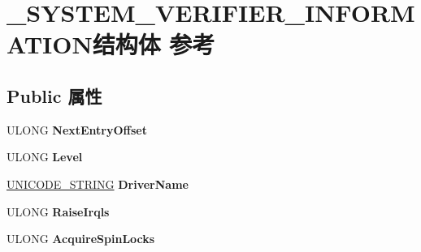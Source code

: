 \hypertarget{struct___s_y_s_t_e_m___v_e_r_i_f_i_e_r___i_n_f_o_r_m_a_t_i_o_n}{}\section{\+\_\+\+S\+Y\+S\+T\+E\+M\+\_\+\+V\+E\+R\+I\+F\+I\+E\+R\+\_\+\+I\+N\+F\+O\+R\+M\+A\+T\+I\+O\+N结构体 参考}
\label{struct___s_y_s_t_e_m___v_e_r_i_f_i_e_r___i_n_f_o_r_m_a_t_i_o_n}
\subsection*{Public 属性}
\begin{DoxyCompactItemize}
\item 
\mbox{\label{struct___s_y_s_t_e_m___v_e_r_i_f_i_e_r___i_n_f_o_r_m_a_t_i_o_n_a7ab8bb6abb715bb66587244fa818f1f8}} 
U\+L\+O\+NG {\bfseries Next\+Entry\+Offset}
\item 
\mbox{\label{struct___s_y_s_t_e_m___v_e_r_i_f_i_e_r___i_n_f_o_r_m_a_t_i_o_n_af77c91cba6a04098281ea027ee5c196c}} 
U\+L\+O\+NG {\bfseries Level}
\item 
\mbox{\label{struct___s_y_s_t_e_m___v_e_r_i_f_i_e_r___i_n_f_o_r_m_a_t_i_o_n_ab1b5341042df119610ce9576370f8b06}} 
\hyperlink{struct___u_n_i_c_o_d_e___s_t_r_i_n_g}{U\+N\+I\+C\+O\+D\+E\+\_\+\+S\+T\+R\+I\+NG} {\bfseries Driver\+Name}
\item 
\mbox{\label{struct___s_y_s_t_e_m___v_e_r_i_f_i_e_r___i_n_f_o_r_m_a_t_i_o_n_a3f919abc1bfde1ee1d3a415d0749ca02}} 
U\+L\+O\+NG {\bfseries Raise\+Irqls}
\item 
\mbox{\label{struct___s_y_s_t_e_m___v_e_r_i_f_i_e_r___i_n_f_o_r_m_a_t_i_o_n_ae7b101b62c2e6fbbcaefd1a236054b42}} 
U\+L\+O\+NG {\bfseries Acquire\+Spin\+Locks}
\item 
\mbox{\label{struct___s_y_s_t_e_m___v_e_r_i_f_i_e_r___i_n_f_o_r_m_a_t_i_o_n_ae96c48facf55b836d41f254bc84b35b0}} 

\end{DoxyCompactItemize}
